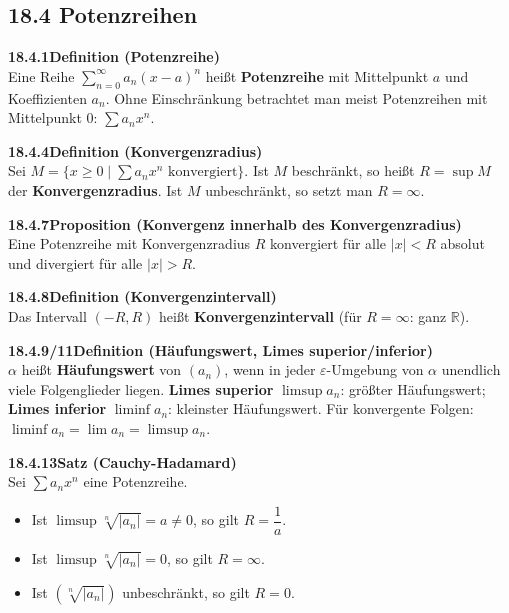 \documentclass[a4paper,12pt]{article}
\newcommand{\gentry}[3]{%
  \noindent\textbf{#1\quad #2}\nopagebreak\\[0.2em]
  #3\par\smallskip
}
\begin{document}
\subsection*{18.4 \quad Potenzreihen}

\gentry{18.4.1}{Definition (Potenzreihe)}{%
  Eine Reihe $\displaystyle\sum_{n=0}^{\infty} a_n(x-a)^n$ heißt \textbf{Potenzreihe}
  mit Mittelpunkt $a$ und Koeffizienten $a_n$. Ohne Einschränkung betrachtet
  man meist Potenzreihen mit Mittelpunkt $0$: $\sum a_n x^n$.
}

\gentry{18.4.4}{Definition (Konvergenzradius)}{%
  Sei $M = \{x \ge 0 \mid \sum a_n x^n \text{ konvergiert}\}$.
  Ist $M$ beschränkt, so heißt $R = \sup M$ der \textbf{Konvergenzradius}.
  Ist $M$ unbeschränkt, so setzt man $R = \infty$.
}

\gentry{18.4.7}{Proposition (Konvergenz innerhalb des Konvergenzradius)}{%
  Eine Potenzreihe mit Konvergenzradius $R$ konvergiert für alle $|x| < R$
  absolut und divergiert für alle $|x| > R$.
}

\gentry{18.4.8}{Definition (Konvergenzintervall)}{%
  Das Intervall $(-R, R)$ heißt \textbf{Konvergenzintervall}
  (für $R = \infty$: ganz $\mathbb{R}$).
}

\gentry{18.4.9/11}{Definition (Häufungswert, Limes superior/inferior)}{%
  $\alpha$ heißt \textbf{Häufungswert} von $(a_n)$, wenn in jeder
  $\varepsilon$-Umgebung von $\alpha$ unendlich viele Folgenglieder liegen.
  \textbf{Limes superior} $\limsup a_n$: größter Häufungswert;
  \textbf{Limes inferior} $\liminf a_n$: kleinster Häufungswert.
  Für konvergente Folgen: $\liminf a_n = \lim a_n = \limsup a_n$.
}

\gentry{18.4.13}{Satz (Cauchy-Hadamard)}{%
  Sei $\sum a_n x^n$ eine Potenzreihe.
  \begin{itemize}[topsep=2pt,itemsep=1pt]
    \item Ist $\limsup\sqrt[n]{|a_n|} = a \ne 0$, so gilt $R = \dfrac{1}{a}$.
    \item Ist $\limsup\sqrt[n]{|a_n|} = 0$, so gilt $R = \infty$.
    \item Ist $(\sqrt[n]{|a_n|})$ unbeschränkt, so gilt $R = 0$.
  \end{itemize}
}
\end{document}
